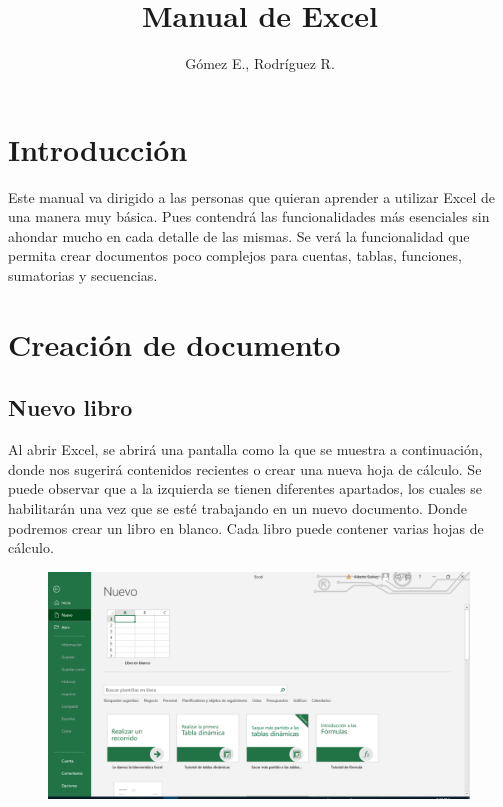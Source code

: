 \documentclass[12pt,a4paper]{book}
\author{Gómez E., Rodríguez R.}
\title{Manual de Excel}
\begin{document}
\maketitle 
\tableofcontents
\doublespacing
\setmainfont{Arial}
\chapter*{Introducción}
Este manual va dirigido a las personas que quieran aprender a utilizar Excel de una manera muy básica. Pues contendrá las funcionalidades más esenciales sin ahondar mucho en cada detalle de las mismas. Se verá la funcionalidad que permita crear documentos poco complejos para cuentas, tablas, funciones, sumatorias y secuencias.
\chapter{Creación de documento}
\section{Nuevo libro}
Al abrir Excel, se abrirá una pantalla como la que se muestra a continuación, donde nos sugerirá contenidos recientes o crear una nueva hoja de cálculo. 
Se puede observar que a la izquierda se tienen diferentes apartados, los cuales se habilitarán una vez que se esté trabajando en un nuevo documento. Donde podremos crear un libro en blanco. Cada libro puede contener varias hojas de cálculo.
\begin{figure}[h]
    \centering
    \includegraphics[width=14cm]{excel1}
\end{figure}
\clearpage
\end{document}
